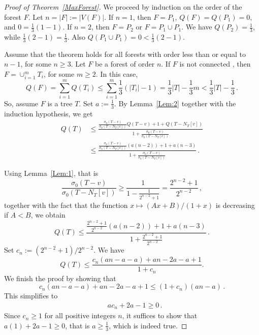 \documentclass[10pt,a4paper]{amsart}
\begin{document}
	\begin{proof} [Proof of Theorem~\ref{MaxForest}]
		We proceed by induction on the order of the forest $F$. Let $n=|F|:=|V(F)|$. If $n=1$, then $F=P_1$, $Q(F)=Q(P_1)=0$, and $0= \frac{1}{3}(1-1)$. If $n=2$, then $F=P_2$ or $F=P_1\cup P_1$. We have
			$Q(P_2)=\frac{1}{3}$, while $\frac{1}{3}\left(2-1\right)=\frac{1}{3}$. Also
			$Q(P_1\cup P_1)=0<\frac{1}{3}\left(2-1\right)$.
            
			Assume that the theorem holds for all forests with order less than or equal to $n-1$, for some $n\geq 3$. Let $F$ be a forest of order $n$. If $F$ is not connected , then $F=\cup_{i=1}^mT_i$, for some $m\geq 2$. In this case,
			\begin{equation*}
			Q(F)=\sum_{i=1}^{m}Q(T_i)\leq \sum_{i=1}^{m}\frac{1}{3}\left(|T_i|-1\right)
					=\frac{1}{3}|T|-\frac{1}{3}m < \frac{1}{3}|T|-\frac{1}{3}\,.
			\end{equation*}
			So, assume $F$ is a tree $T$. 
    Set $a:=\frac{1}{3}$. By Lemma~\ref{Lem:2} together with the induction hypothesis, we get
		\begin{equation*}
	\begin{aligned}
			Q(T)&\leq \frac{\displaystyle\frac{\sigma_0\left(T-v\right)}{\sigma_0\left(T-N_T[v]\right)}Q(T-v)+1+Q\left(T-N_T[v]\right)}{1+\displaystyle\frac{\sigma_0\left(T-v\right)}{\sigma_0\left(T-N_T[v]\right)}}\\
			&\leq \frac{\displaystyle\frac{\sigma_0\left(T-v\right)}{\sigma_0\left(T-N_T[v]\right)}(a(n-2))+1+a(n-3)}{1+\displaystyle\frac{\sigma_0\left(T-v\right)}{\sigma_0\left(T-N_T[v]\right)}}\,.
	\end{aligned}
	\end{equation*}
    
	Using Lemma~\ref{Lem:1}, that is $$\frac{\sigma_0\left(T-v\right)}{\sigma_0\left(T-N_T[v]\right)}\geq \frac{1}{\displaystyle 1-\frac{1}{2^{n-2}+1}}=\frac{2^{n-2}+1}{2^{n-2}}\,,$$ 
    together with the fact that the function $x \mapsto (Ax+B)/(1+x)$ is decreasing  if $A< B$, we obtain
	\begin{equation*}
		Q(T)\leq \frac{\displaystyle\frac{2^{n-2}+1}{2^{n-2}}\left(a(n-2)\right)+ 1+a(n-3)}{1+\displaystyle \frac{2^{n-2}+1}{2^{n-2}}}\,.
	\end{equation*}
	Set $c_n:=(2^{n-2}+1) / 2^{n-2}$. We have
	\begin{equation*}
		Q(T)\leq \frac{c_n\left(an-a-a\right)+an-2a-a+1}{1+c_n}.
	\end{equation*}
  We finish the proof by showing that  
$$c_n\left(an-a-a\right)+an-2a-a+1\leq \left(1+c_n\right)\left(an-a\right)\,.$$
This simplifies to 
	\begin{equation*}
		\begin{aligned}
			& ac_n+2a-1\geq 0\,.
		\end{aligned}
	\end{equation*}
	Since $c_n\geq 1$ for all positive integers $n$, it suffices to show that $a(1)+2a-1 \geq 0$, that is $a\geq \frac{1}{3}$,
	which is indeed true.
	\end{proof}
\end{document}
